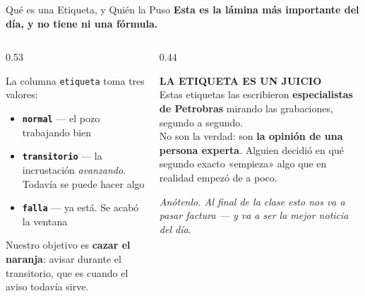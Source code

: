 \documentclass[aspectratio=169, 11pt]{beamer}
\begin{document}
\begin{frame}[shrink=8]{Qué es una Etiqueta, y Quién la Puso}
  \vspace{-4pt}
  {\small\color{arcaDark}\bfseries
   Esta es la lámina más importante del día, y no tiene ni una fórmula.}
  \vspace{7pt}
  \begin{columns}[T]
    \begin{column}{0.53\textwidth}
      {\footnotesize\color{textMuted}
      La columna \texttt{etiqueta} toma tres valores:
      \vspace{5pt}
      \begin{itemize}\setlength{\itemsep}{5pt}
        \item[{\color{codeGreen}\scriptsize\faCheck}]
          \textbf{\texttt{normal}} --- el pozo trabajando bien
        \item[{\color{codeOrange}\scriptsize\faExclamationTriangle}]
          \textbf{\texttt{transitorio}} --- la incrustación \emph{avanzando}.
          Todavía se puede hacer algo
        \item[{\color{arcaRed}\scriptsize\faTimes}]
          \textbf{\texttt{falla}} --- ya está. Se acabó la ventana
      \end{itemize}}
      \vspace{7pt}
      {\footnotesize\color{arcaDark}
       Nuestro objetivo es \textbf{cazar el naranja}: avisar durante el
       transitorio, que es cuando el aviso todavía sirve.}
    \end{column}
    \begin{column}{0.44\textwidth}
      \begin{tcolorbox}[colback=arcaGray, colframe=arcaRed, boxrule=0pt, leftrule=3pt,
        arc=3pt, left=6pt, right=6pt, top=5pt, bottom=5pt]
        {\scriptsize\color{arcaRed}\bfseries\faUserEdit\hspace{4pt}LA ETIQUETA ES UN JUICIO}\\[4pt]
        {\scriptsize\color{textMuted}
         Estas etiquetas las escribieron \textbf{especialistas de Petrobras}
         mirando las grabaciones, segundo a segundo.\\[4pt]
         No son la verdad: son \textbf{la opinión de una persona experta}.
         Alguien decidió en qué segundo exacto «empieza» algo que en realidad
         empezó de a poco.}
      \end{tcolorbox}
      \vspace{5pt}
      {\scriptsize\color{arcaDark}\itshape
        Anótenlo. Al final de la clase esto nos va a pasar factura ---
        y va a ser la mejor noticia del día.}
    \end{column}
  \end{columns}
\end{frame}
\end{document}
